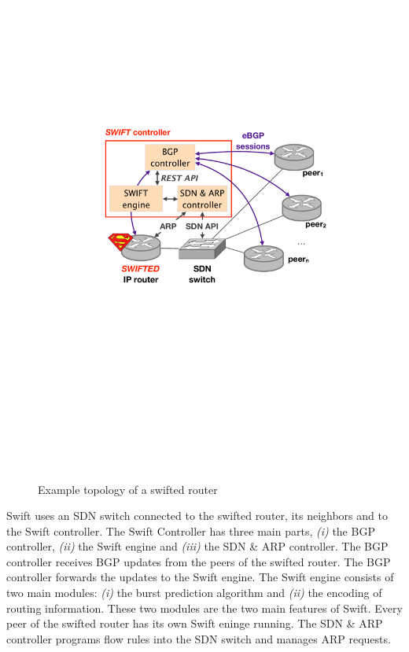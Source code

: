 \begin{figure}[h]
\center
\includegraphics[scale = 0.5]{Figures/bckgrnd_swift_architecture.pdf}
\caption{Example topology of a swifted router \cite{swift}}
\end{figure}

Swift uses an SDN switch connected to the swifted router, its neighbors and to the Swift controller. The Swift Controller has three main parts, \emph{(i)} the BGP controller, \emph{(ii)} the Swift engine and \emph{(iii)} the SDN \& ARP controller. The BGP controller receives BGP updates from the peers of the swifted router. The BGP controller forwards the updates to the Swift engine. The Swift engine consists of two main modules: \emph{(i)} the burst prediction algorithm and \emph{(ii)} the encoding of routing information. These two modules are the two main features of Swift. Every peer of the swifted router has its own Swift eninge running. The SDN \& ARP controller programs flow rules into the SDN switch and manages ARP requests. 

